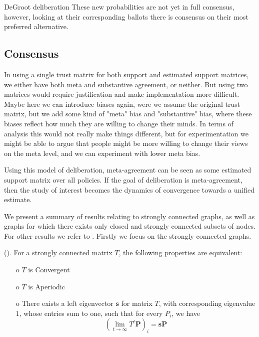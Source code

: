 \begin{example}{DeGroot deliberation}
	These new probabilities are not yet in full consensus, however, looking at their corresponding ballots there is consensus on their most preferred alternative.
	\label{example:deGroot-delib}
\end{example}

\subsection{Consensus}
\label{sub: concensus DeGroot}
\textcolor{RedViolet}{In using a single trust matrix for both support and estimated support matrices, we either have both meta and substantive agreement, or neither. But using two matrices would require justification and make implementation more difficult. Maybe here we can introduce biases again, were we assume the original trust matrix, but we add some kind of "meta" bias and "substantive" bias, where these biases reflect how much they are willing to change their minds. In terms of analysis this would not really make things different, but for experimentation we might be able to argue that people might be more willing to change their views on the meta level, and we can experiment with lower meta bias.}

Using this model of deliberation, meta-agreement can be seen as some estimated support matrix over all policies. If the goal of deliberation is meta-agreement, then the study of interest becomes the dynamics of convergence towards a unified estimate.

We present a summary of results relating to strongly connected graphs, as well as graphs for which there exists only closed and strongly connected subsets of nodes. For other results we refer to \citet{golubNaiveLearningSocial2010}. Firstly we focus on the strongly connected graphs.

\begin{proposition}{(\citet{golubNaiveLearningSocial2010}).}
	For a strongly connected matrix \(T\), the following properties are equivalent:
	\begin{itemize}
		\item[o] \(T\) is Convergent
		\item[o] \(T\) is Aperiodic
		\item[o] There exists a left eigenvector \(\boldsymbol{s}\) for matrix \(T\), with corresponding eigenvalue \(1\), whose entries sum to one, such that for every $P_i$, we have
			\[\left(\lim_{t\to \infty}T^{t} \boldsymbol{P}\right)_{i} = \boldsymbol{s}\boldsymbol{P}\]
	\end{itemize}
\end{proposition}


